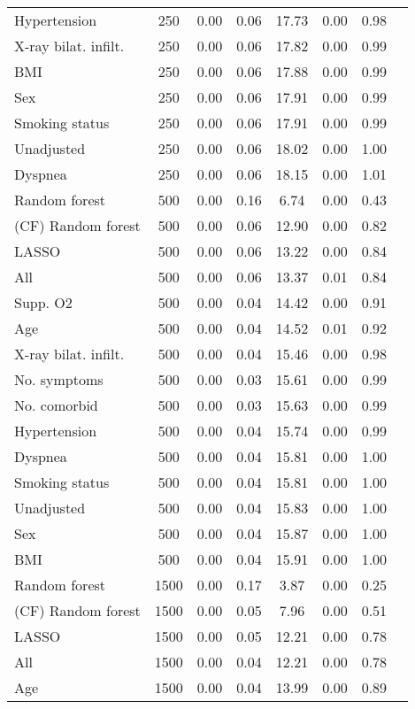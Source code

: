 \documentclass{article}
\begin{document}
{\begin{longtable}{lccccccc}
Hypertension & 250 & 0.00 & 0.06 & 17.73 &  0.00 & 0.98 \\ 
X-ray bilat. infilt. & 250 & 0.00 & 0.06 & 17.82 &  0.00 & 0.99 \\ 
BMI & 250 & 0.00 & 0.06 & 17.88 &  0.00 & 0.99 \\ 
Sex & 250 & 0.00 & 0.06 & 17.91 &  0.00 & 0.99 \\ 
Smoking status & 250 & 0.00 & 0.06 & 17.91 &  0.00 & 0.99 \\ 
Unadjusted & 250 & 0.00 & 0.06 & 18.02 &  0.00 & 1.00 \\ 
Dyspnea & 250 & 0.00 & 0.06 & 18.15 &  0.00 & 1.01 \\ \midrule() 
Random forest & 500 & 0.00 & 0.16 &  6.74 &  0.00 & 0.43 \\ 
(CF) Random forest & 500 & 0.00 & 0.06 & 12.90 &  0.00 & 0.82 \\ 
LASSO & 500 & 0.00 & 0.06 & 13.22 &  0.00 & 0.84 \\ 
All & 500 & 0.00 & 0.06 & 13.37 &  0.01 & 0.84 \\ 
Supp. O2 & 500 & 0.00 & 0.04 & 14.42 &  0.00 & 0.91 \\ 
Age & 500 & 0.00 & 0.04 & 14.52 &  0.01 & 0.92 \\ 
X-ray bilat. infilt. & 500 & 0.00 & 0.04 & 15.46 &  0.00 & 0.98 \\ 
No. symptoms & 500 & 0.00 & 0.03 & 15.61 &  0.00 & 0.99 \\ 
No. comorbid & 500 & 0.00 & 0.03 & 15.63 &  0.00 & 0.99 \\ 
Hypertension & 500 & 0.00 & 0.04 & 15.74 &  0.00 & 0.99 \\ 
Dyspnea & 500 & 0.00 & 0.04 & 15.81 &  0.00 & 1.00 \\ 
Smoking status & 500 & 0.00 & 0.04 & 15.81 &  0.00 & 1.00 \\ 
Unadjusted & 500 & 0.00 & 0.04 & 15.83 &  0.00 & 1.00 \\ 
Sex & 500 & 0.00 & 0.04 & 15.87 &  0.00 & 1.00 \\ 
BMI & 500 & 0.00 & 0.04 & 15.91 &  0.00 & 1.00 \\ \midrule() 
Random forest & 1500 & 0.00 & 0.17 &  3.87 &  0.00 & 0.25 \\ 
(CF) Random forest & 1500 & 0.00 & 0.05 &  7.96 &  0.00 & 0.51 \\ 
LASSO & 1500 & 0.00 & 0.05 & 12.21 &  0.00 & 0.78 \\ 
All & 1500 & 0.00 & 0.04 & 12.21 &  0.00 & 0.78 \\ 
Age & 1500 & 0.00 & 0.04 & 13.99 &  0.00 & 0.89 \\ 

\end{longtable}}
\end{document}
